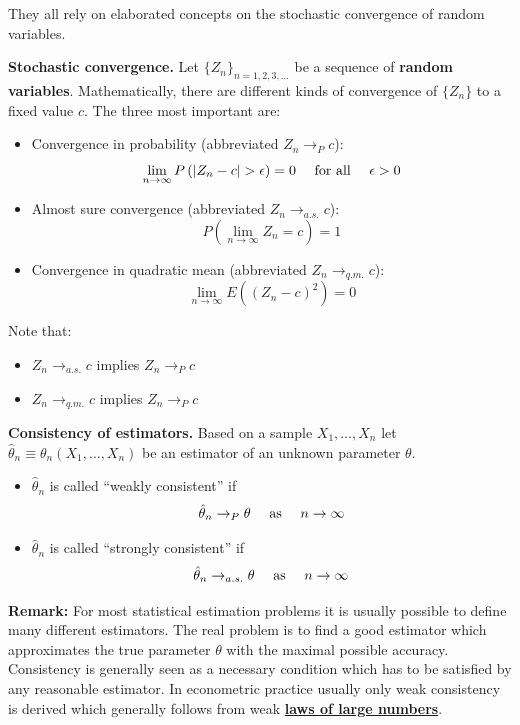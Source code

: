 \documentclass[]{book}
\providecommand{\tightlist}{%
  \setlength{\itemsep}{0pt}\setlength{\parskip}{0pt}}
\theoremstyle{definition}
\theoremstyle{definition}
\theoremstyle{definition}
\theoremstyle{remark}
\begin{document}
They all rely on elaborated concepts on the stochastic convergence of random variables.

\textbf{Stochastic convergence.}
Let \(\{Z_n\}_{n=1,2,3,\dots}\) be a sequence of \textbf{random variables}. Mathematically, there are different kinds of convergence of
\(\{Z_n\}\) to a fixed value \(c\). The three most important are:

\begin{itemize}
\tightlist
\item
  Convergence in probability (abbreviated \(Z_n\to_P c\)):
  \[\lim_{n\to\infty} P\left(|Z_n-c|>\epsilon\right)=0\quad\hbox{ for all }\quad\epsilon>0\]
\item
  Almost sure convergence (abbreviated \(Z_n\to_{a.s.} c\)):
  \[P\left(\lim_{n\to\infty} Z_n=c\right)=1\]
\item
  Convergence in quadratic mean (abbreviated \(Z_n\to_{q.m.} c\)):
  \[\lim_{n\to\infty} E\left((Z_n-c)^2\right)=0\]
\end{itemize}

Note that:

\begin{itemize}
\tightlist
\item
  \(Z_n\to_{a.s.} c\) implies \(Z_n\to_P c\)
\item
  \(Z_n\to_{q.m.} c\) implies \(Z_n\to_P c\)
\end{itemize}

\textbf{Consistency of estimators.} Based on a sample \(X_1,\dots,X_n\) let \(\hat\theta_n\equiv\theta_n(X_1,\dots,X_n)\) be an estimator of an unknown parameter \(\theta\).

\begin{itemize}
\tightlist
\item
  \(\hat\theta_n\) is called ``weakly consistent'' if
  \[\hat{\theta}_n\to_{P} \theta\quad \hbox{ as }\quad n\to\infty \]
\item
  \(\hat\theta_n\) is called ``strongly consistent'' if
  \[\hat{\theta}_n\to_{a.s.} \theta\quad \hbox{ as }\quad n\to\infty \]
\end{itemize}

\textbf{Remark:} For most statistical estimation problems it is usually possible to define many different estimators. The real problem is to find a good estimator which approximates the true parameter \(\theta\) with the maximal possible accuracy. Consistency is generally seen as a necessary condition which has to be satisfied by any reasonable estimator. In econometric practice usually only weak consistency is derived which generally follows from weak \href{https://www.statlect.com/asymptotic-theory/law-of-large-numbers}{\textbf{laws of large numbers}}.
\end{document}

